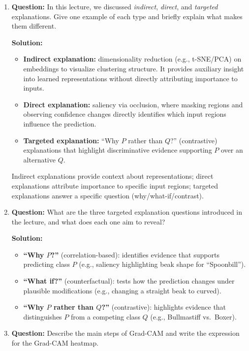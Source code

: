 \documentclass{article}
\begin{document}
\begin{enumerate}

\item \textbf{Question:}  
In this lecture, we discussed \emph{indirect}, \emph{direct}, and \emph{targeted} explanations.  
Give one example of each type and briefly explain what makes them different.

\textbf{Solution:}  
\begin{itemize}
    \item \textbf{Indirect explanation:} dimensionality reduction (e.g., t-SNE/PCA) on embeddings to visualize clustering structure. It provides auxiliary insight into learned representations without directly attributing importance to inputs.
    \item \textbf{Direct explanation:} saliency via occlusion, where masking regions and observing confidence changes directly identifies which input regions influence the prediction.
    \item \textbf{Targeted explanation:} ``Why $P$ rather than $Q$?'' (contrastive) explanations that highlight discriminative evidence supporting $P$ over an alternative $Q$.
\end{itemize}
Indirect explanations provide context about representations; direct explanations attribute importance to specific input regions; targeted explanations answer a specific question (why/what-if/contrast).

\item \textbf{Question:}  
What are the three targeted explanation questions introduced in the lecture, and what does each one aim to reveal?

\textbf{Solution:}  
\begin{itemize}
    \item \textbf{``Why $P$?''} (correlation-based): identifies evidence that supports predicting class $P$ (e.g., saliency highlighting beak shape for ``Spoonbill'').
    \item \textbf{``What if?''} (counterfactual): tests how the prediction changes under plausible modifications (e.g., changing a straight beak to curved).
    \item \textbf{``Why $P$ rather than $Q$?''} (contrastive): highlights evidence that distinguishes $P$ from a competing class $Q$ (e.g., Bullmastiff vs.\ Boxer).
\end{itemize}

\item \textbf{Question:}  
Describe the main steps of Grad-CAM and write the expression for the Grad-CAM heatmap.


\end{enumerate}
\end{document}
